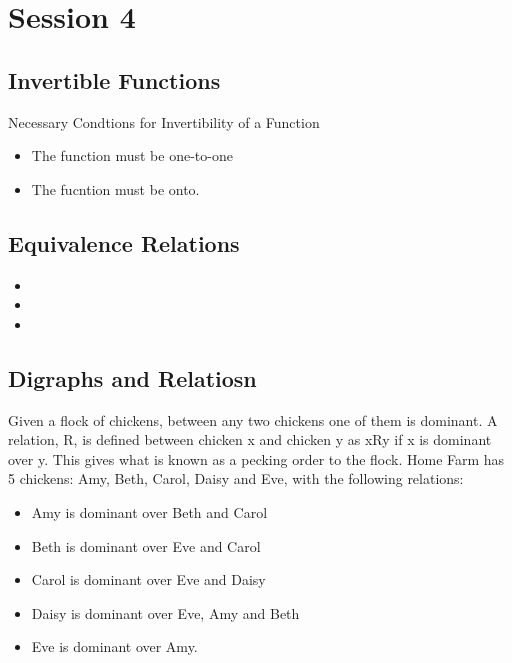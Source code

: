 \documentclass[]{report}
\begin{document}
\chapter{Session 4}
\section*{Invertible Functions}

Necessary Condtions for Invertibility of a Function
\begin{itemize}
\item The function must be one-to-one
\item The fucntion must be onto.
\end{itemize}


\section*{Equivalence Relations}
\begin{itemize}
\item
\item
\item
\end{itemize}




\section{Digraphs and Relatiosn}
Given a flock of chickens, between any two chickens one of them is
dominant. A relation, R, is defined between chicken x and chicken y as xRy if x is
dominant over y. This gives what is known as a pecking order to the flock. Home
Farm has 5 chickens: Amy, Beth, Carol, Daisy and Eve, with the following relations:

\begin{itemize}
\item Amy is dominant over Beth and Carol
\item Beth is dominant over Eve and Carol
\item Carol is dominant over Eve and Daisy
\item Daisy is dominant over Eve, Amy and Beth
\item Eve is dominant over Amy.
\end{itemize}
\end{document}
